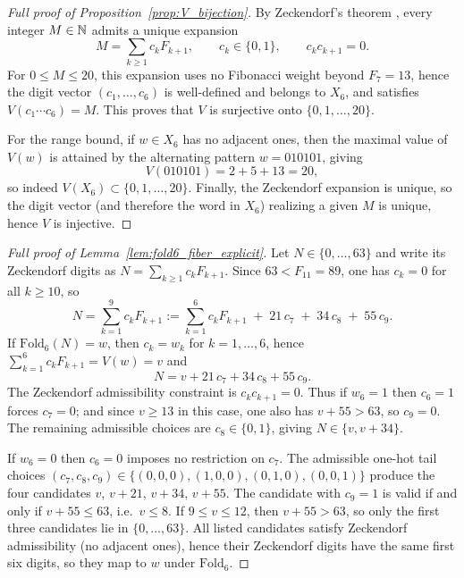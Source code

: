 \begin{proof}[Full proof of Proposition~\ref{prop:V_bijection}]
By Zeckendorf's theorem \cite{Zeckendorf1972}, every integer $M\in\mathbb{N}$ admits a unique expansion
\[
M=\sum_{k\ge 1} c_k F_{k+1},\qquad c_k\in\{0,1\},\qquad c_kc_{k+1}=0.
\]
For $0\le M\le 20$, this expansion uses no Fibonacci weight beyond $F_7=13$, hence the digit vector $(c_1,\dots,c_6)$ is well-defined and belongs to $X_6$, and satisfies $V(c_1\cdots c_6)=M$.
This proves that $V$ is surjective onto $\{0,1,\dots,20\}$.

For the range bound, if $w\in X_6$ has no adjacent ones, then the maximal value of $V(w)$ is attained by the alternating pattern $w=010101$, giving
\[
V(010101)=2+5+13=20,
\]
so indeed $V(X_6)\subset\{0,1,\dots,20\}$.
Finally, the Zeckendorf expansion is unique, so the digit vector (and therefore the word in $X_6$) realizing a given $M$ is unique, hence $V$ is injective.
\end{proof}

\begin{proof}[Full proof of Lemma~\ref{lem:fold6_fiber_explicit}]
Let $N\in\{0,\dots,63\}$ and write its Zeckendorf digits as $N=\sum_{k\ge 1} c_k F_{k+1}$.
Since $63<F_{11}=89$, one has $c_k=0$ for all $k\ge 10$, so
\[
N=\sum_{k=1}^{9} c_k F_{k+1}
:=\sum_{k=1}^{6} c_k F_{k+1} \;+\; 21\,c_7 \;+\; 34\,c_8 \;+\; 55\,c_9.
\]
If $\mathrm{Fold}_6(N)=w$, then $c_k=w_k$ for $k=1,\dots,6$, hence $\sum_{k=1}^{6} c_k F_{k+1}=V(w)=v$ and
\[
N=v+21\,c_7+34\,c_8+55\,c_9.
\]
The Zeckendorf admissibility constraint is $c_kc_{k+1}=0$.
Thus if $w_6=1$ then $c_6=1$ forces $c_7=0$; and since $v\ge 13$ in this case, one also has $v+55>63$, so $c_9=0$.
The remaining admissible choices are $c_8\in\{0,1\}$, giving $N\in\{v,v+34\}$.

If $w_6=0$ then $c_6=0$ imposes no restriction on $c_7$.
The admissible one-hot tail choices $(c_7,c_8,c_9)\in\{(0,0,0),(1,0,0),(0,1,0),(0,0,1)\}$ produce the four candidates $v$, $v+21$, $v+34$, $v+55$.
The candidate with $c_9=1$ is valid if and only if $v+55\le 63$, i.e.\ $v\le 8$.
If $9\le v\le 12$, then $v+55>63$, so only the first three candidates lie in $\{0,\dots,63\}$.
All listed candidates satisfy Zeckendorf admissibility (no adjacent ones), hence their Zeckendorf digits have the same first six digits, so they map to $w$ under $\mathrm{Fold}_6$.
\end{proof}

